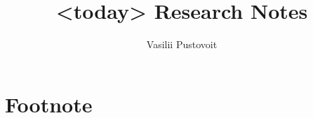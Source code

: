 \documentclass{article}
\author{Vasilii Pustovoit}
\title{<today> Research Notes}
\begin{document}
\maketitle








\newpage
\section{Footnote}
\end{document}

